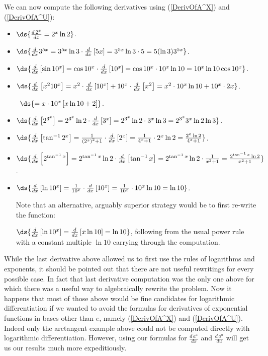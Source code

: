 \bex We can now compute the following derivatives using (\ref{DerivOfA^X})
and (\ref{DerivOfA^U}):
\begin{itemize}
\item $\ds{\frac{d\,2^x}{dx}=2^x\ln2}$.
\item $\ds{\frac{d}{dx}3^{5x}=3^{5x}\ln 3\cdot\frac{d}{dx}\left[5x\right]
           =3^{5x}\ln3\cdot 5=5(\ln 3)3^{5x}}$.
\item $\ds{\frac{d}{dx}\left[\sin10^x\right]=\cos10^x\cdot\frac{d}{dx}
           \left[10^x\right]=\cos10^x\cdot 10^x\ln10=10^x\ln10\cos10^x}$.
\item $\ds{\frac{d}{dx}\left[x^210^x\right]=x^2\cdot\frac{d}{dx}
           \left[10^x\right]+10^x\cdot\frac{d}{dx}\left[x^2\right]
           =x^2\cdot10^x\ln10+10^x\cdot2x}$.

          \qquad\qquad\quad\ $\ds{=x\cdot10^x\left[x\ln10+2\right]}$.
\item $\ds{\frac{d}{dx}\left[2^{3^x}\right]
  =2^{3^x}\ln2\cdot\frac{d}{dx}\left[3^x\right]
  =2^{3^x}\ln2\cdot3^x\ln3=2^{3^x}3^x\ln2\ln3}$.
\item $\ds{\frac{d}{dx}\left[\tan^{-1}2^x\right]
          =\frac1{\left(2^x\right)^2+1}\cdot\frac{d}{dx}\left[2^x\right]
          =\frac1{4^x+1}\cdot2^x\ln2=\frac{2^x\ln2}{4^x+1}}$.
\item $\ds{\frac{d}{dx}\left[2^{\tan^{-1}x}\right]
          =2^{\tan^{-1}x}\ln2\cdot\frac{d}{dx}\left[\tan^{-1}x\right]
          =2^{\tan^{-1}x}\ln2\cdot\frac1{x^2+1}
          =\frac{2^{\tan^{-1}x}\ln2}{x^2+1}}$.
\item $\ds{\frac{d}{dx}\left[\ln10^x\right]=\frac{1}{10^x}\cdot
          \frac{d}{dx}\left[10^x\right]
          =\frac1{10^x}\cdot10^x\ln10=\ln10}$.

Note that an alternative, arguably superior strategy would be to first 
re-write the function:

$\ds{\frac{d}{dx}\left[\ln 10^x\right]=\frac{d}{dx}\left[x\ln10\right]=\ln10}$,
following from the usual power rule with a constant multiple $\ln10$
carrying through the computation.
\end{itemize}

\eex
While the last derivative above allowed us to first use the 
rules of logarithms and exponents, it should be pointed out that 
there are not useful rewritings for every possible case.  In fact that last
derivative computation was the only one above for which there
was a useful way to algebraically rewrite the problem.  
Now it happens that most
of those above would be fine candidates for logarithmic differentiation
if we wanted to avoid the formulas for derivatives of 
exponential functions in bases other than $e$, namely 
(\ref{DerivOfA^X}) and (\ref{DerivOfA^U}).  Indeed
only the arctangent example
above could not be computed directly with logarithmic differentiation.
However, using our formulas for $\frac{d\,a^x}{dx}$ and $\frac{d\,a^u}{du}$
will get us our results much more expeditiously.

